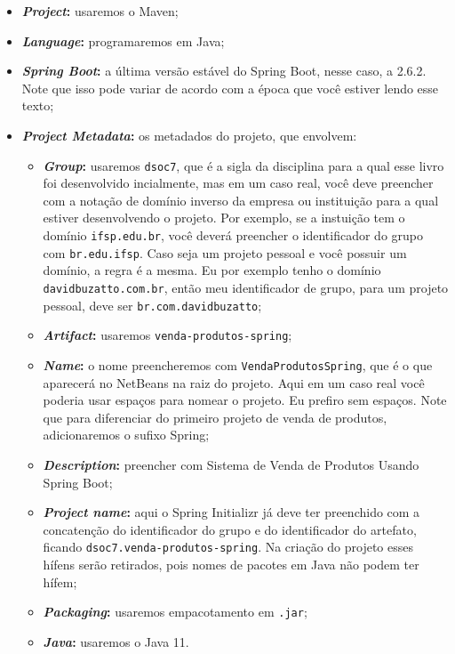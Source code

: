 \begin{itemize}

    \item \textbf{\textit{Project}:} usaremos o Maven;
    
    \item \textbf{\textit{Language}:} programaremos em Java;
    
    \item \textbf{\textit{Spring Boot}:} a última versão estável do Spring Boot, nesse caso, a 2.6.2. Note que isso pode variar de acordo com a época que você estiver lendo esse texto;
    
    \item \textbf{\textit{Project Metadata}:} os metadados do projeto, que envolvem:
    
    \begin{itemize}
    
        \item \textbf{\textit{Group}:} usaremos \texttt{dsoc7}, que é a sigla da disciplina para a qual esse livro foi desenvolvido incialmente, mas em um caso real, você deve preencher com a notação de domínio inverso da empresa ou instituição para a qual estiver desenvolvendo o projeto. Por exemplo, se a instuição tem o domínio \texttt{ifsp.edu.br}, você deverá preencher o identificador do grupo com \texttt{br.edu.ifsp}. Caso seja um projeto pessoal e você possuir um domínio, a regra é a mesma. Eu por exemplo tenho o domínio \texttt{davidbuzatto.com.br}, então meu identificador de grupo, para um projeto pessoal, deve ser \texttt{br.com.davidbuzatto};
        
        \item \textbf{\textit{Artifact}:} usaremos \texttt{venda-produtos-spring};
        
        \item \textbf{\textit{Name}:} o nome preencheremos com \texttt{VendaProdutosSpring}, que é o que aparecerá no NetBeans na raiz do projeto. Aqui em um caso real você poderia usar espaços para nomear o projeto. Eu prefiro sem espaços. Note que para diferenciar do primeiro projeto de venda de produtos, adicionaremos o sufixo Spring;
        
        \item \textbf{\textit{Description}:} preencher com Sistema de Venda de Produtos Usando Spring Boot;
        
        \item \textbf{\textit{Project name}:} aqui o Spring Initializr já deve ter preenchido com a concatenção do identificador do grupo e do identificador do artefato, ficando \texttt{dsoc7.venda-produtos-spring}. Na criação do projeto esses hífens serão retirados, pois nomes de pacotes em Java não podem ter hífem;
        
        \item \textbf{\textit{Packaging}:} usaremos empacotamento em \texttt{.jar};
        
        \item \textbf{\textit{Java}:} usaremos o Java 11.
        
    \end{itemize}
\end{itemize}


